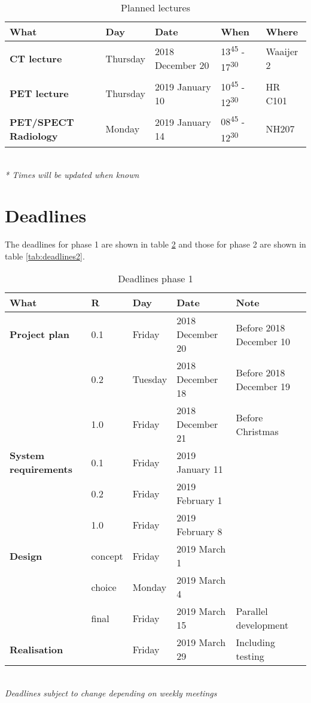 \begin{table} [h!]
	\begin{tabular}{l|llll}
		\textbf{What} 		&	Day 		&	Date				&	When & Where\\
		\hline
		\textbf{CT lecture}	&	Thursday	&	2018 December 20	& 13\textsuperscript{45} - 17\textsuperscript{30} & Waaijer 2\\
		\rowcolor{Gray}
		\textbf{PET lecture}&	Thursday	& 	2019 January 10 	& 10\textsuperscript{45} - 12\textsuperscript{30} & HR C101 \\
		\textbf{PET/SPECT Radiology}& 	Monday 	&	2019 January 14	& 08\textsuperscript{45} - 12\textsuperscript{30} & NH207\\
		\hline
	\end{tabular} \\
	\textit{* Times will be updated when known}
	\caption{Planned lectures}
	\label{tab:lectures}
\end{table}

\newpage
\section{Deadlines}
The deadlines for phase 1 are shown in table \ref{tab:deadlines} and those for phase 2 are shown in table \ref{tab:deadlines2}.

\begin{table}[h!]
	\hspace{-1cm}\begin{tabular}{l|llll}
		\textbf{What} 		&	R	& 	Day	&	Date	&	Note \\
		\hline
		\textbf{Project plan}& 0.1	& Friday 		& 2018 December 20	&	Before 2018 December 10 \\
		\rowcolor{Gray}
		 	&	0.2 	&	 Tuesday & 2018 December 18 & Before 2018 December 19\\
		 	&	1.0		&	Friday	&  2018 December 21 & Before Christmas\\
		 	\hline
		 	\rowcolor{Gray}
		\textbf{System requirements} & 0.1 & Friday & 2019 January 11 & \\
		& 0.2 & Friday & 2019 February 1 & \\
		\rowcolor{Gray}
			&	1.0		& Friday &	2019 February 8 &\\
		\hline
		\textbf{Design} & concept &Friday & 2019 March 1 & \\
		\rowcolor{Gray}
		 & choice & Monday & 2019 March 4 &  \\
		 & final  & Friday & 2019 March 15 & Parallel development \\
		 \hline
		 \rowcolor{Gray}
		 \textbf{Realisation} & & Friday & 2019 March 29 & Including testing\\
		 \hline
	\end{tabular}\hspace{-1cm}\\
	\textit{Deadlines subject to change depending on weekly meetings}
	\caption{Deadlines phase 1}
	\label{tab:deadlines}
\end{table}

